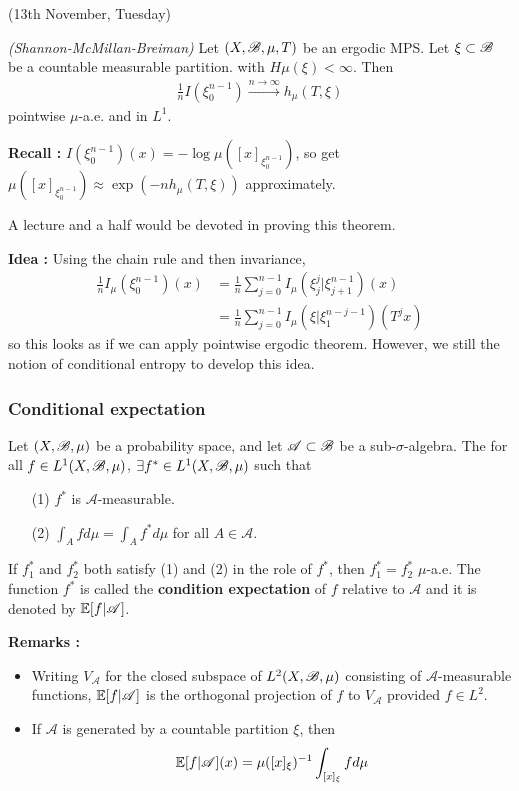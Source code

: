 \documentclass[10pt,a4paper]{report}
\newenvironment{proof}
{\begin{changemargin}{1cm}{0.5cm} 
	}%
	{\end{changemargin}
}
\begin{document}
\newday

(13th November, Tuesday)
\s

\thm \emph{(Shannon-McMillan-Breiman)} Let $(X, \mathscr{B}, \mu, T)$ be an ergodic MPS. Let $\xi \subset \mathscr{B}$ be a countable measurable partition. with $H\mu(\xi) < \infty$. Then
\begin{align*}
\frac{1}{n} I(\xi^{n-1}_0) \xrightarrow{n\rightarrow \infty} h_{\mu}(T,\xi) 
\end{align*}
pointwise $\mu$-a.e. and in $L^1$.
\s

\textbf{Recall :} $I(\xi_0^{n-1})(x) = -\log \mu([x]_{\xi_0^{n-1}})$, so get $\mu([x]_{\xi_0^{n-1}})\approx \exp( -n h_{\mu}(T,\xi))$ approximately.
\s

A lecture and a half would be devoted in proving this theorem.

\begin{proof}
\textbf{Idea :} Using the chain rule and then invariance,
\begin{align*}
\frac{1}{n} I_{\mu}(\xi^{n-1}_0)(x) &= \frac{1}{n} \sum_{j=0}^{n-1} I_{\mu}(\xi_j^j |\xi_{j+1}^{n-1})(x) \\
&= \frac{1}{n} \sum_{j=0}^{n-1} I_{\mu}(\xi | \xi_1^{n-j-1})(T^j x)
\end{align*}
so this looks as if we can apply pointwise ergodic theorem. However, we still the notion of conditional entropy to develop this idea.
\end{proof}

\subsubsection*{Conditional expectation}

Let $(X,\mathscr{B}, \mu)$ be a probability space, and let $\mathscr{A} \subset \mathscr{B}$ be a sub-$\sigma$-algebra. The for all $f\in L^1(X,\mathscr{B}, \mu)$, $\exists f^* \in L^1(X, \mathscr{B}, \mu)$ such that
\begin{itemize}
\item[(1)] $f^*$ is $\mathscr{A}$-measurable.
\item[(2)] $\int_A fd\mu = \int_A f^* d\mu$ for all $A \in \mathscr{A}$.
\end{itemize}
If $f_1^*$ and $f_2^*$ both satisfy (1) and (2) in the role of $f^*$, then $f_1^* = f_2^*$ $\mu$-a.e. The function $f^*$ is called the \textbf{condition expectation} of $f$ relative to $\mathscr{A}$ and it is denoted by $\mathbb{E}  [f| \mathscr{A}]$.
\s

\textbf{Remarks :}
\begin{itemize}
\item Writing $V_{\mathscr{A}}$ for the closed subspace of $L^2(X,\mathscr{B}, \mu)$ consisting of $\mathscr{A}$-measurable functions, $\mathbb{E}[f|\mathscr{A}]$ is the orthogonal projection of $f$ to $V_{\mathscr{A}}$ provided $f\in L^2$. 
\item If $\mathscr{A}$ is generated by a countable partition $\xi$, then
\begin{align*}
\mathbb{E}[f | \mathscr{A}](x)  = \mu([x]_{\xi})^{-1} \int_{[x]_{\xi}} fd\mu
\end{align*}
\end{itemize}
\s
\end{document}
